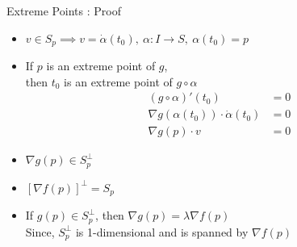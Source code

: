 \documentclass{beamer}
\begin{document}
\begin{frame}{Extreme Points : Proof}
\begin{itemize}
	\item $v \in S_p \implies v = \dot{\alpha}(t_0),\ \alpha : I \to S,\ \alpha(t_0) = p$
	\item If $p$ is an extreme point of $g$,\\
		 then $t_0$ is an extreme point of $g \circ \alpha$
	\begin{align*}
		(g \circ \alpha)'(t_0) & = 0  \\
       		\nabla g(\alpha(t_0)) \cdot \dot{\alpha}(t_0) & = 0 \\
		\nabla g(p)\cdot v & = 0
	\end{align*}
	\item $\nabla g(p) \in S_p^\perp$
	\item $[\nabla f(p)]^\perp = S_p$
	\item If $g(p) \in S_p^\perp$, then $\nabla g(p) = \lambda \nabla f(p)$\\
		Since, $S_p^\perp$ is 1-dimensional and is spanned by $\nabla f(p)$
\end{itemize}
\end{frame}

\end{document}

